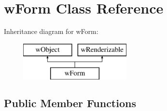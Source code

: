 \hypertarget{classwForm}{
\section{wForm Class Reference}
\label{classwForm}
}
Inheritance diagram for wForm:\begin{figure}[H]
\begin{center}
\leavevmode
\includegraphics[height=2.000000cm]{classwForm}
\end{center}
\end{figure}
\subsection*{Public Member Functions}
